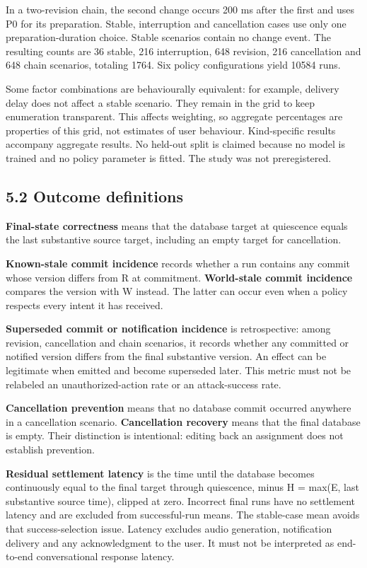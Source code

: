 \documentclass[10pt]{article}
\begin{document}
In a two-revision chain, the second change occurs 200 ms after the first and uses P0 for its preparation. Stable, interruption and cancellation cases use only one preparation-duration choice. Stable scenarios contain no change event. The resulting counts are 36 stable, 216 interruption, 648 revision, 216 cancellation and 648 chain scenarios, totaling 1764. Six policy configurations yield 10584 runs.


Some factor combinations are behaviourally equivalent: for example, delivery delay does not affect a stable scenario. They remain in the grid to keep enumeration transparent. This affects weighting, so aggregate percentages are properties of this grid, not estimates of user behaviour. Kind-specific results accompany aggregate results. No held-out split is claimed because no model is trained and no policy parameter is fitted. The study was not preregistered.


\subsection*{5.2 Outcome definitions}

\textbf{Final-state correctness} means that the database target at quiescence equals the last substantive source target, including an empty target for cancellation.


\textbf{Known-stale commit incidence} records whether a run contains any commit whose version differs from R at commitment. \textbf{World-stale commit incidence} compares the version with W instead. The latter can occur even when a policy respects every intent it has received.


\textbf{Superseded commit or notification incidence} is retrospective: among revision, cancellation and chain scenarios, it records whether any committed or notified version differs from the final substantive version. An effect can be legitimate when emitted and become superseded later. This metric must not be relabeled an unauthorized-action rate or an attack-success rate.


\textbf{Cancellation prevention} means that no database commit occurred anywhere in a cancellation scenario. \textbf{Cancellation recovery} means that the final database is empty. Their distinction is intentional: editing back an assignment does not establish prevention.


\textbf{Residual settlement latency} is the time until the database becomes continuously equal to the final target through quiescence, minus H = max(E, last substantive source time), clipped at zero. Incorrect final runs have no settlement latency and are excluded from successful-run means. The stable-case mean avoids that success-selection issue. Latency excludes audio generation, notification delivery and any acknowledgment to the user. It must not be interpreted as end-to-end conversational response latency.
\end{document}
